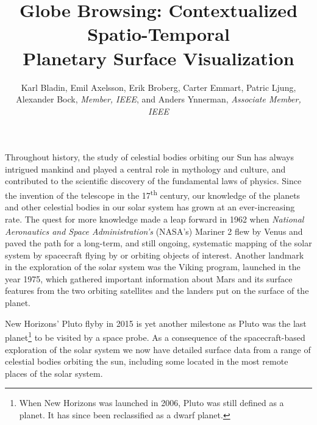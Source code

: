 \documentclass[journal]{vgtc}                %
\title{Globe Browsing: Contextualized Spatio-Temporal \\
Planetary Surface Visualization}
\author{Karl Bladin, Emil Axelsson, Erik Broberg, Carter Emmart, Patric Ljung, \\ Alexander Bock, \textit{Member, IEEE}, and Anders Ynnerman, \textit{Associate Member, IEEE}}
\newcommand{\kallecomment}[1]{\textbf{[-Kalle-~}
    \textcolor{orange}{#1}
    \textbf{~]}}
\newcommand{\emilcomment}[1]{\textbf{[-Emil-~}
    \textcolor{red}{#1}
    \textbf{~]}}
\newcommand{\alexcomment}[1]{\textbf{[-Alex-~}
    \textcolor{magenta}{#1}
    \textbf{~]}}
\newcommand{\dsup}[1]{\textsuperscript{#1}}
\begin{document}

 \label{sec:introduction}
\maketitle


Throughout history, the study of celestial bodies orbiting our Sun has always intrigued mankind and played a central role in mythology and culture, and contributed to the scientific discovery of the fundamental laws of physics.
Since the invention of the telescope in the 17\dsup{th} century, our knowledge of the planets and other celestial bodies in our solar system has grown at an ever-increasing rate.
The quest for more knowledge made a leap forward in 1962 when \emph{National Aeronautics and Space Administration's} (NASA's) Mariner 2 flew by Venus and paved the path for a long-term, and still ongoing, systematic mapping of the solar system by spacecraft flying by or orbiting objects of interest.
Another landmark in the exploration of the solar system was the Viking program, launched in the year 1975, which gathered important information about Mars and its surface features from the two orbiting satellites and the landers put on the surface of the planet.

New Horizons' Pluto flyby in 2015 is yet another milestone as Pluto was the last planet\footnote{When New Horizons was launched in 2006, Pluto was still defined as a planet. It has since been reclassified as a dwarf planet.} to be visited by a space probe. As a consequence of the spacecraft-based exploration of the solar system we now have detailed surface data from a range of celestial bodies orbiting the sun, including some located in the most remote places of the solar system. 
\end{document}
